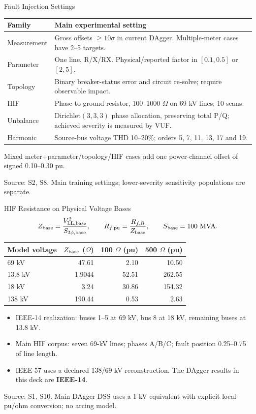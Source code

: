 \documentclass{beamer}
\newcommand{\src}[1]{\par\vfill\begin{minipage}{0.67\textwidth}\tiny\color{gray}Source: #1.\end{minipage}\par}
\begin{document}
\begin{frame}{Fault Injection Settings}
  \small
  \renewcommand{\arraystretch}{1.15}
  \begin{tabularx}{\textwidth}{L{2.55cm}X}
    \toprule
    Family & Main experimental setting \\
    \midrule
    Measurement & Gross offsets $\geq10\sigma$ in current DAgger. Multiple-meter cases have 2--5 targets. \\
    Parameter & One line, R/X/RX. Physical/reported factor in $[0.1,0.5]$ or $[2,5]$. \\
    Topology & Binary breaker-status error and circuit re-solve; require observable impact. \\
    HIF & Phase-to-ground resistor, 100--1000 $\Omega$ on 69-kV lines; 10 scans. \\
    Unbalance & Dirichlet$(3,3,3)$ phase allocation, preserving total P/Q; achieved severity is measured by VUF. \\
    Harmonic & Source-bus voltage THD 10--20\%; orders 5, 7, 11, 13, 17 and 19. \\
    \bottomrule
  \end{tabularx}
  \par\vspace{0.6em}
  \small Mixed meter+parameter/topology/HIF cases add one power-channel offset of signed 0.10--0.30 pu.
  \src{S2, S8. Main training settings; lower-severity sensitivity populations are separate}
\end{frame}

\begin{frame}{HIF Resistance on Physical Voltage Bases}
  \[Z_{\rm base}=\frac{V_{\rm LL,base}^2}{S_{\rm 3\phi,base}},\qquad
    R_{f,\rm pu}=\frac{R_{f,\Omega}}{Z_{\rm base}},\qquad S_{\rm base}=100\ \mathrm{MVA}.\]
  \begin{center}
    \begin{tabular}{lrrr}
      \toprule
      Model voltage & $Z_{\rm base}$ ($\Omega$) & 100 $\Omega$ (pu) & 500 $\Omega$ (pu) \\
      \midrule
      69 kV & 47.61 & 2.10 & 10.50 \\
      13.8 kV & 1.9044 & 52.51 & 262.55 \\
      18 kV & 3.24 & 30.86 & 154.32 \\
      138 kV & 190.44 & 0.53 & 2.63 \\
      \bottomrule
    \end{tabular}
  \end{center}
  \begin{itemize}
    \item IEEE-14 realization: buses 1--5 at 69 kV, bus 8 at 18 kV, remaining buses at 13.8 kV.
    \item Main HIF corpus: seven 69-kV lines; phases A/B/C; fault position 0.25--0.75 of line length.
    \item IEEE-57 uses a declared 138/69-kV reconstruction. The DAgger results in this deck are \textbf{IEEE-14}.
  \end{itemize}
  \src{S1, S10. Main DAgger DSS uses a 1-kV equivalent with explicit local-pu/ohm conversion; no arcing model}
\end{frame}
\end{document}
